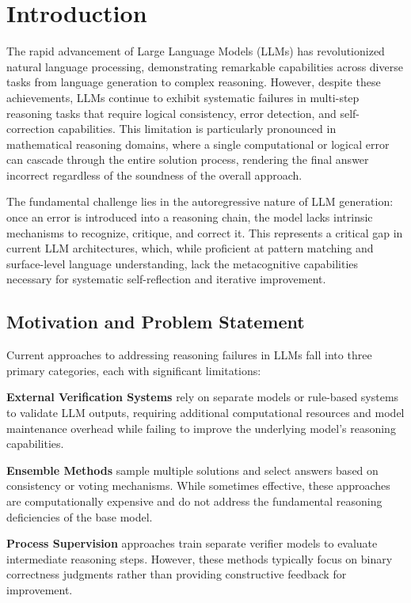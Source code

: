\documentclass[10pt,twocolumn]{article}
\begin{document}
\section{Introduction}

The rapid advancement of Large Language Models (LLMs) has revolutionized natural language processing, demonstrating remarkable capabilities across diverse tasks from language generation to complex reasoning. However, despite these achievements, LLMs continue to exhibit systematic failures in multi-step reasoning tasks that require logical consistency, error detection, and self-correction capabilities. This limitation is particularly pronounced in mathematical reasoning domains, where a single computational or logical error can cascade through the entire solution process, rendering the final answer incorrect regardless of the soundness of the overall approach.

The fundamental challenge lies in the autoregressive nature of LLM generation: once an error is introduced into a reasoning chain, the model lacks intrinsic mechanisms to recognize, critique, and correct it. This represents a critical gap in current LLM architectures, which, while proficient at pattern matching and surface-level language understanding, lack the metacognitive capabilities necessary for systematic self-reflection and iterative improvement.

\subsection{Motivation and Problem Statement}

Current approaches to addressing reasoning failures in LLMs fall into three primary categories, each with significant limitations:

\textbf{External Verification Systems} rely on separate models or rule-based systems to validate LLM outputs, requiring additional computational resources and model maintenance overhead while failing to improve the underlying model's reasoning capabilities.

\textbf{Ensemble Methods} sample multiple solutions and select answers based on consistency or voting mechanisms. While sometimes effective, these approaches are computationally expensive and do not address the fundamental reasoning deficiencies of the base model.

\textbf{Process Supervision} approaches train separate verifier models to evaluate intermediate reasoning steps. However, these methods typically focus on binary correctness judgments rather than providing constructive feedback for improvement.
\end{document}
